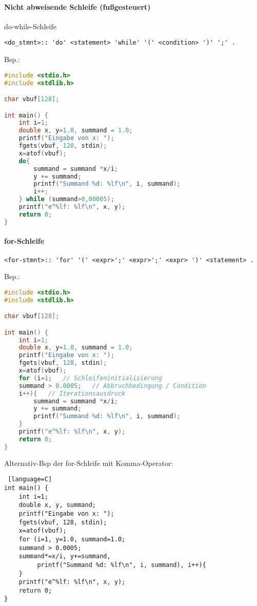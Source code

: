 \paragraph{Nicht abweisende Schleife (fußgesteuert)} do-while-Schleife
\begin{lstlisting}
<do_stmnt>:: 'do' <statement> 'while' '(' <condition> ')' ';' .
\end{lstlisting}

Bsp.:
\begin{lstlisting}[language=C]
#include <stdio.h>
#include <stdlib.h>

char vbuf[128];

int main() {
	int i=1;
	double x, y=1.0, summand = 1.0;
	printf("Eingabe von x: ");
	fgets(vbuf, 128, stdin);
	x=atof(vbuf);
	do{
		summand = summand *x/i;
		y += summand;
		printf("Summand %d: %lf\n", i, summand);
		i++;
	} while (summand>0,00005);
	printf("e^%lf: %lf\n", x, y);
	return 0;
}
\end{lstlisting}

\paragraph{for-Schleife}
\begin{lstlisting}
<for-stmnt>:: 'for' '(' <expr>';' <expr>';' <expr> ')' <statement> .
\end{lstlisting}

Bsp.:
\begin{lstlisting}[language=C]
#include <stdio.h>
#include <stdlib.h>

char vbuf[128];

int main() {
	int i=1;
	double x, y=1.0, summand = 1.0;
	printf("Eingabe von x: ");
	fgets(vbuf, 128, stdin);
	x=atof(vbuf);
	for (i=1; 	// Schleifeninitialisierung
	summand > 0.0005; 	// Abbruchbedingung / Condition
	i++){	// Iterationsausdruck
		summand = summand *x/i;
		y += summand;
		printf("Summand %d: %lf\n", i, summand);
	}
	printf("e^%lf: %lf\n", x, y);
	return 0;
}
\end{lstlisting}

Alternativ-Bsp der for-Schleife mit Komma-Operator:
\begin{lstlisting} [language=C]
int main() {
	int i=1;
	double x, y, summand;
	printf("Eingabe von x: ");
	fgets(vbuf, 128, stdin);
	x=atof(vbuf);
	for (i=1, y=1.0, summand=1.0;
	summand > 0.0005;
	summand*=x/i, y+=summand,
		 printf("Summand %d: %lf\n", i, summand), i++){
	}
	printf("e^%lf: %lf\n", x, y);
	return 0;
}
\end{lstlisting}









